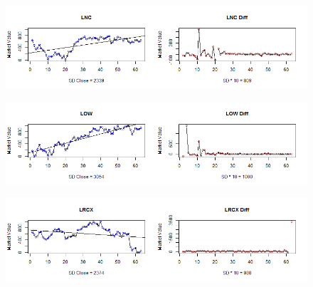 \begin{figure}[!h]
	\includegraphics[scale=0.5]{images/appendixC/LNC_FRST.png}
\end{figure}

\begin{figure}[!h]
	\includegraphics[scale=0.5]{images/appendixC/LOW_FRST.png}
\end{figure}

\begin{figure}[!h]
	\includegraphics[scale=0.5]{images/appendixC/LRCX_FRST.png}
\end{figure}

